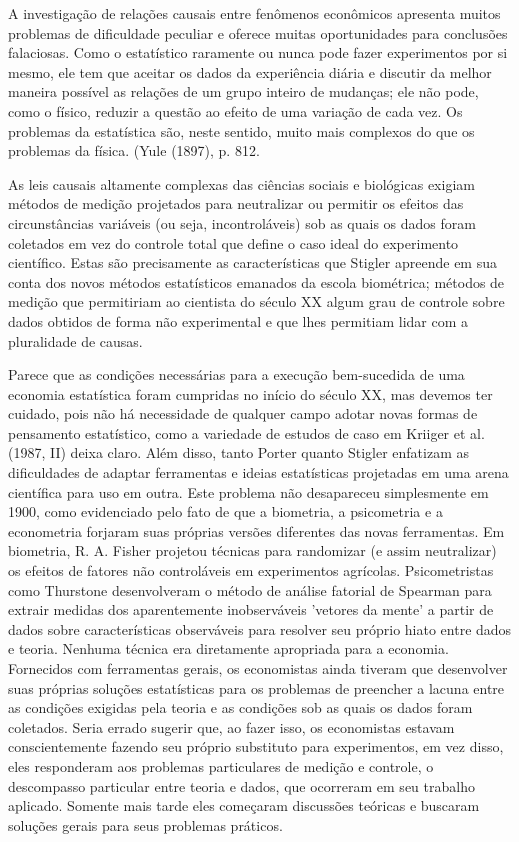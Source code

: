 \documentclass[12pt]{article}
\begin{document}
A investigação de relações causais entre fenômenos econômicos apresenta muitos problemas de dificuldade peculiar e oferece muitas oportunidades para conclusões falaciosas. Como o estatístico raramente ou nunca pode fazer experimentos por si mesmo, ele tem que aceitar os dados da experiência diária e discutir da melhor maneira possível as relações de um grupo inteiro de mudanças; ele não pode, como o físico, reduzir a questão ao efeito de uma variação de cada vez. Os problemas da estatística são, neste sentido, muito mais complexos do que os problemas da física. (Yule (1897), p. 812.

As leis causais altamente complexas das ciências sociais e biológicas exigiam métodos de medição projetados para neutralizar ou permitir os efeitos das circunstâncias variáveis (ou seja, incontroláveis) sob as quais os dados foram coletados em vez do controle total que define o caso ideal do experimento científico. Estas são precisamente as características que Stigler apreende em sua conta dos novos métodos estatísticos emanados da escola biométrica; métodos de medição que permitiriam ao cientista do século XX algum grau de controle sobre dados obtidos de forma não experimental e que lhes permitiam lidar com a pluralidade de causas.

Parece que as condições necessárias para a execução bem-sucedida de uma economia estatística foram cumpridas no início do século XX, mas devemos ter cuidado, pois não há necessidade de qualquer campo adotar novas formas de pensamento estatístico, como a variedade de estudos de caso em Kriiger et al. (1987, II) deixa claro. Além disso, tanto Porter quanto Stigler enfatizam as dificuldades de adaptar ferramentas e ideias estatísticas projetadas em uma arena científica para uso em outra. Este problema não desapareceu simplesmente em 1900, como evidenciado pelo fato de que a biometria, a psicometria e a econometria forjaram suas próprias versões diferentes das novas ferramentas. Em biometria, R. A. Fisher projetou técnicas para randomizar (e assim neutralizar) os efeitos de fatores não controláveis em experimentos agrícolas. Psicometristas como Thurstone desenvolveram o método de análise fatorial de Spearman para extrair medidas dos aparentemente inobserváveis 'vetores da mente' a partir de dados sobre características observáveis para resolver seu próprio hiato entre dados e teoria. Nenhuma técnica era diretamente apropriada para a economia. Fornecidos com ferramentas gerais, os economistas ainda tiveram que desenvolver suas próprias soluções estatísticas para os problemas de preencher a lacuna entre as condições exigidas pela teoria e as condições sob as quais os dados foram coletados. Seria errado sugerir que, ao fazer isso, os economistas estavam conscientemente fazendo seu próprio substituto para experimentos, em vez disso, eles responderam aos problemas particulares de medição e controle, o descompasso particular entre teoria e dados, que ocorreram em seu trabalho aplicado. Somente mais tarde eles começaram discussões teóricas e buscaram soluções gerais para seus problemas práticos.
\end{document}
